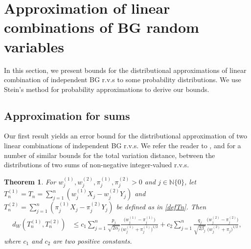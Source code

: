 \documentclass[12pt, a4paper,reqno]{amsart}
\newtheorem{thm}{Theorem}[section]
\theoremstyle{definition}
\theoremstyle{myremark}
\numberwithin{equation}{section}
\begin{document}
\section{Approximation of linear combinations of BG random variables}\label{BSBGD}
\noindent
In this section, we present bounds for the distributional approximations of linear combination of independent BG r.v.s to some probability distributions. We use Stein's method for probability approximations to derive our bounds.
\subsection{Approximation for sums}Our first result yields an error bound for the distributional approximation of two linear combinations of independent BG r.v.s. We refer the reader to \cite{Ransum2024}, \cite{roos2003} and \cite{PVBC} for a number of similar bounds for the total variation distance, between the distributions of two sums of non-negative integer-valued r.v.s. 
\begin{thm}\label{twosumsthm}
	For $w_j^{(1)},w_j^{(2)}, \pi_j^{(1)},\pi_j^{(2)}>0$ and $j\in \mathbb{N} \{ 0\}$, let $T_n^{(1)}=T_n= \sum_{j=1}^{n}(w_j^{(1)}X_j-w_j^{(2)}Y_j)$ and  $T_n^{(2)}= \sum_{j=1}^{n}(\pi_j^{(1)}X_j-\pi_j^{(2)}Y_j)$ be defined as in \eqref{defTn}. Then
	\begin{align}\label{twosumbd}
		d_W(T_n^{(1)},T_n^{(2)}) &\leq c_1 \sum_{j=1}^{n}\frac{p_j}{\sqrt{2\alpha_j}} \frac{ \big(w_j^{(1)} - \pi_{j}^{(1)}\big) }{\big(w_j^{(1)} + \pi_{j}^{(1)}\big)^{1/2}}+c_2\sum_{j=1}^{n}\frac{q_j}{\sqrt{2\beta_j}}\frac{\big(w_j^{(2)}-\pi_{j}^{(2)}\big)}{\big(w_j^{(2)}+\pi_{j}\big)^{1/2}},
	\end{align}
	where $c_1$ and $c_2$ are two positive constants.
\end{thm}
\vspace{-0.6cm}
\end{document}
